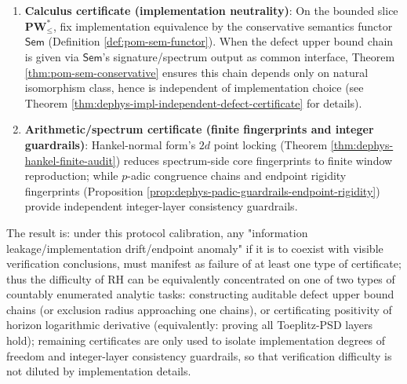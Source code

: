 \begin{theorem}
\begin{enumerate}
\begin{itemize}
  \end{itemize}
  Thus the two chains are mathematically equivalent but have complementary failure witnesses: the former uses defect lower bound/exclusion radius stagnation as witness, the latter uses finite-dimensional negative eigenvalue as witness.
  \item \textbf{Calculus certificate (implementation neutrality)}:
  On the bounded slice \(\mathbf{PW}^{\ast}_{\le}\), fix implementation equivalence by the conservative semantics functor \(\mathsf{Sem}\) (Definition \ref{def:pom-sem-functor}).
  When the defect upper bound chain is given via \(\mathsf{Sem}\)'s signature/spectrum output as common interface, Theorem \ref{thm:pom-sem-conservative} ensures this chain depends only on natural isomorphism class, hence is independent of implementation choice (see Theorem \ref{thm:dephys-impl-independent-defect-certificate} for details).
  \item \textbf{Arithmetic/spectrum certificate (finite fingerprints and integer guardrails)}:
  Hankel-normal form's \(2d\) point locking (Theorem \ref{thm:dephys-hankel-finite-audit}) reduces spectrum-side core fingerprints to finite window reproduction;
  while \(p\)-adic congruence chains and endpoint rigidity fingerprints (Proposition \ref{prop:dephys-padic-guardrails-endpoint-rigidity}) provide independent integer-layer consistency guardrails.
\end{enumerate}
The result is: under this protocol calibration, any "information leakage/implementation drift/endpoint anomaly" if it is to coexist with visible verification conclusions, must manifest as failure of at least one type of certificate;
thus the difficulty of RH can be equivalently concentrated on one of two types of countably enumerated analytic tasks: constructing auditable defect upper bound chains (or exclusion radius approaching one chains), or certificating positivity of horizon logarithmic derivative (equivalently: proving all Toeplitz-PSD layers hold); remaining certificates are only used to isolate implementation degrees of freedom and integer-layer consistency guardrails, so that verification difficulty is not diluted by implementation details.
\end{theorem}

